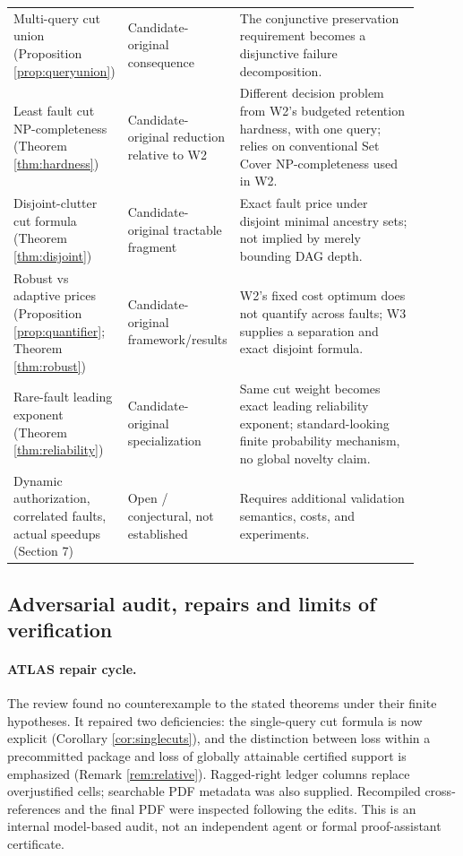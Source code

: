 \documentclass[11pt,letterpaper]{article}
\begin{document}
\begin{longtable}{@{}>{\raggedright\arraybackslash}p{0.23\linewidth}>{\raggedright\arraybackslash}p{0.205\linewidth}>{\raggedright\arraybackslash}p{0.465\linewidth}@{}}
Multi-query cut union (Proposition \ref{prop:queryunion}) & Candidate-original consequence & The conjunctive preservation requirement becomes a disjunctive failure decomposition.\\
Least fault cut NP-completeness (Theorem \ref{thm:hardness}) & Candidate-original reduction relative to W2 & Different decision problem from W2's budgeted retention hardness, with one query; relies on conventional Set Cover NP-completeness used in W2.\\
Disjoint-clutter cut formula (Theorem \ref{thm:disjoint}) & Candidate-original tractable fragment & Exact fault price under disjoint minimal ancestry sets; not implied by merely bounding DAG depth.\\
Robust vs adaptive prices (Proposition \ref{prop:quantifier}; Theorem \ref{thm:robust}) & Candidate-original framework/results & W2's fixed cost optimum does not quantify across faults; W3 supplies a separation and exact disjoint formula.\\
Rare-fault leading exponent (Theorem \ref{thm:reliability}) & Candidate-original specialization & Same cut weight becomes exact leading reliability exponent; standard-looking finite probability mechanism, no global novelty claim.\\
Dynamic authorization, correlated faults, actual speedups (Section 7) & Open / conjectural, not established & Requires additional validation semantics, costs, and experiments.\\
\bottomrule
\end{longtable}
\normalsize

\subsection{Adversarial audit, repairs and limits of verification}
\paragraph{ATLAS repair cycle.} The review found no counterexample to the stated theorems under their finite hypotheses. It repaired two deficiencies: the single-query cut formula is now explicit (Corollary \ref{cor:singlecuts}), and the distinction between loss within a precommitted package and loss of globally attainable certified support is emphasized (Remark \ref{rem:relative}). Ragged-right ledger columns replace overjustified cells; searchable PDF metadata was also supplied. Recompiled cross-references and the final PDF were inspected following the edits. This is an internal model-based audit, not an independent agent or formal proof-assistant certificate.
\end{document}
